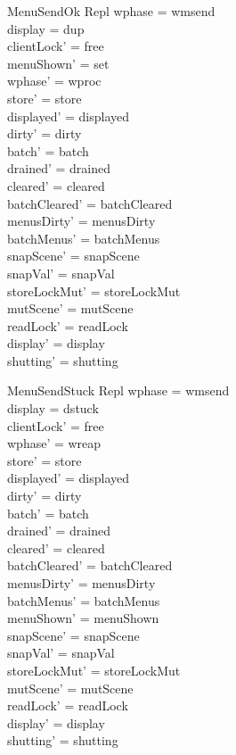 \documentclass[a4paper,10pt,fleqn]{article}
\begin{document}
\begin{schema}{MenuSendOk}
  \Delta Repl
\where
  wphase = wmsend \\
  display = dup \\
  clientLock' = free \\
  menuShown' = set \\
  wphase' = wproc \\
  store' = store \\
  displayed' = displayed \\
  dirty' = dirty \\
  batch' = batch \\
  drained' = drained \\
  cleared' = cleared \\
  batchCleared' = batchCleared \\
  menusDirty' = menusDirty \\
  batchMenus' = batchMenus \\
  snapScene' = snapScene \\
  snapVal' = snapVal \\
  storeLockMut' = storeLockMut \\
  mutScene' = mutScene \\
  readLock' = readLock \\
  display' = display \\
  shutting' = shutting
\end{schema}

\begin{schema}{MenuSendStuck}
  \Delta Repl
\where
  wphase = wmsend \\
  display = dstuck \\
  clientLock' = free \\
  wphase' = wreap \\
  store' = store \\
  displayed' = displayed \\
  dirty' = dirty \\
  batch' = batch \\
  drained' = drained \\
  cleared' = cleared \\
  batchCleared' = batchCleared \\
  menusDirty' = menusDirty \\
  batchMenus' = batchMenus \\
  menuShown' = menuShown \\
  snapScene' = snapScene \\
  snapVal' = snapVal \\
  storeLockMut' = storeLockMut \\
  mutScene' = mutScene \\
  readLock' = readLock \\
  display' = display \\
  shutting' = shutting
\end{schema}
\end{document}
